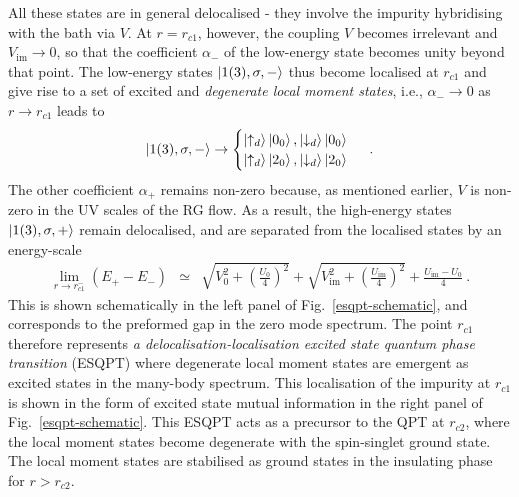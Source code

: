 \documentclass{iopart}
\begin{document}
All these states are in general delocalised - they involve the impurity hybridising with the bath via \(V\). At \(r = r_{c1}\), however, the coupling \(V\) becomes irrelevant and \(V_\text{im} \to 0\), so that the coefficient \(\alpha_-\) of the low-energy state becomes unity beyond that point. The low-energy states \(\ket{1(3),\sigma,-}\) thus become localised at \(r_{c1}\) and give rise to a set of excited and {\it degenerate local moment states}, i.e., $\alpha_- \to 0$ as $r \to r_{c1}$ leads to
\begin{eqnarray}
\ket{1(3),\sigma,-} \to \begin{cases}
	\ket{\uparrow_d}\ket{0_0}, \ket{\downarrow_d}\ket{0_0}\\
	\ket{\uparrow_d}\ket{2_0}, \ket{\downarrow_d}\ket{2_0}\\
\end{cases}~.
\end{eqnarray}
The other coefficient \(\alpha_+\) remains non-zero because, as mentioned earlier, \(V\) is non-zero in the UV scales of the RG flow. As a result, the high-energy states \(\ket{1(3),\sigma,+}\) remain delocalised, and are separated from the localised states by an energy-scale
\begin{eqnarray}
\lim_{r \to r_{c1}^-} \left(E_+ - E_-\right) &\simeq & \sqrt{V_0^2 + \left(\frac{U_0}{4}\right)^2} + \sqrt{V_{\text{im}}^2 + \left(\frac{U_{\text{im}}}{4}\right)^2} + \frac{U_{\text{im}}-U_0}{4}~.
\end{eqnarray}
This is shown schematically in the left panel of Fig.~\eqref{esqpt-schematic}, and corresponds to the preformed gap in the zero mode spectrum. The point \(r_{c1}\) therefore represents {\it a delocalisation-localisation excited state quantum phase transition} (ESQPT) where degenerate local moment states are emergent as excited states in the many-body spectrum. This localisation of the impurity at $r_{c1}$ is shown in the form of excited state mutual information in the right panel of Fig.~\eqref{esqpt-schematic}. This ESQPT acts as a precursor to the QPT at $r_{c2}$, where the local moment states become degenerate with the spin-singlet ground state. The local moment states are stabilised as ground states in the insulating phase for $r>r_{c2}$. 
\end{document}
